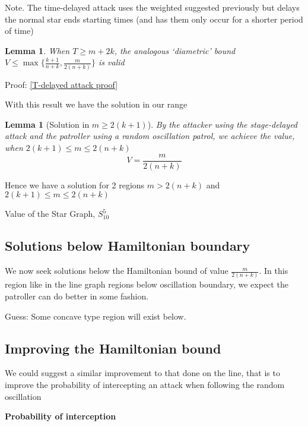 \documentclass[a4paper,10pt]{article}
\newtheorem{lemma}[theorem]{Lemma}
\theoremstyle{definition}
\theoremstyle{definition}
\theoremstyle{remark}
\theoremstyle{definition}
\begin{document}
Note. The time-delayed attack uses the weighted suggested previously but delays the normal star ends starting times (and has them only occur for a shorter period of time)


\begin{lemma}
When $T \geq m+2k$, the analogous `diametric' bound $V \leq \max \{ \frac{k+1}{n+k} , \frac{m}{2(n+k)}   \}$ is valid
\end{lemma}

Proof: \ref{T-delayed attack proof}

With this result we have the solution in our range

\begin{lemma}[Solution in $m \geq 2(k+1)$]
By the attacker using the stage-delayed attack and the patroller using a random oscillation patrol, we achieve the value, when $2(k+1) \leq m \leq 2(n+k)$
$$V=\frac{m}{2(n+k)}$$
\end{lemma}

Hence we have a solution for 2 regions $m > 2(n+k)$ and $2(k+1) \leq m \leq 2(n+k)$

\begin{myfigure}
\resizebox{0.95\linewidth}{!}{
}
\caption{Value of the Star Graph, $S_{10}^{5}$}
\end{myfigure}

\subsection{Solutions below Hamiltonian boundary}
We now seek solutions below the Hamiltonian bound of value $ \frac{m}{2(n+k)}$. In this region like in the line graph regions below oscillation boundary, we expect the patroller can do better in some fashion.

Guess: Some concave type region will exist below.

\subsection{Improving the Hamiltonian bound}
We could suggest a similar improvement to that done on the line, that is to improve the probability of intercepting an attack when following the random oscillation

\textbf{Probability of interception}
\end{document}
